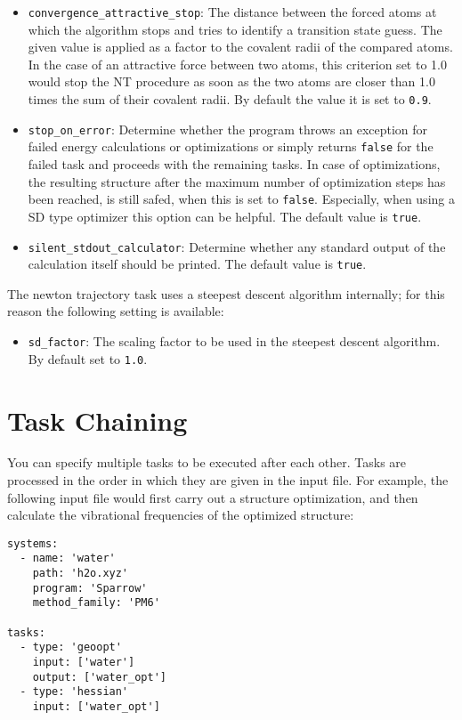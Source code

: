 \documentclass[]{tufte-book}
\begin{document}
\begin{itemize}
\item \texttt{convergence\_attractive\_stop}: The distance between the forced atoms at which the algorithm stops and tries to identify
a transition state guess. The given value is applied as a factor to the covalent radii of the compared atoms.
In the case of an attractive force between two atoms, this criterion set to 1.0 would stop the NT procedure as soon as the two atoms
are closer than 1.0 times the sum of their covalent radii.
By default the value it is set to \texttt{0.9}.
\item \texttt{stop\_on\_error}: Determine whether the program throws an exception for failed energy calculations or optimizations or simply returns \texttt{false} for the failed task and proceeds with the remaining tasks. In case of optimizations, the resulting structure after the maximum number of optimization steps has been reached, is still safed, when this is set to \texttt{false}. Especially, when using a SD type optimizer this option can be helpful. The default value is \texttt{true}.
\item \texttt{silent\_stdout\_calculator}: Determine whether any standard output of the calculation itself should be printed. The default value is \texttt{true}.
\end{itemize}

The newton trajectory task uses a steepest descent algorithm internally; for this reason the following setting is available:
\begin{itemize}
\item \texttt{sd\_factor}: The scaling factor to be used in the steepest descent algorithm. By default set to \texttt{1.0}.
\end{itemize}

\section{Task Chaining}
\label{sec:task_chaining}

You can specify multiple tasks to be executed after each other. Tasks are processed in the order in which they are given in
the input file. For example, the following input file would first carry out a structure optimization, and then calculate
the vibrational frequencies of the optimized structure:

\begin{verbatim}
systems:
  - name: 'water'
    path: 'h2o.xyz'
    program: 'Sparrow'
    method_family: 'PM6'

tasks:
  - type: 'geoopt'
    input: ['water']
    output: ['water_opt']
  - type: 'hessian'
    input: ['water_opt']
\end{verbatim}
\end{document}
